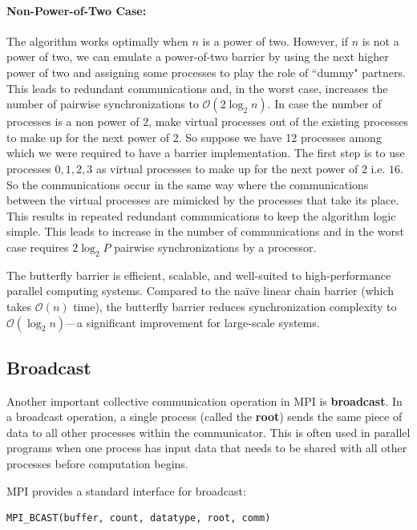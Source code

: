 \documentclass[12pt]{book}
\begin{document}
\paragraph{Non-Power-of-Two Case:}  
The algorithm works optimally when $n$ is a power of two. However, if $n$ is not a power of two, we can emulate a power-of-two barrier by using the next higher power of two and assigning some processes to play the role of ``dummy" partners. This leads to redundant communications and, in the worst case, increases the number of pairwise synchronizations to $\mathcal{O}(2\log_2 n)$. In case the number of processes is a non power of $2$, make virtual processes out of the existing processes to make up for the next power of $2$. So suppose we have 12 processes among which we were required to have a barrier implementation. The first step is to use processes $0,1,2,3$ as virtual processes to make up for the next power of $2$ i.e. $16$. So the communications occur in the same way where the communications between the virtual processes are mimicked by the processes that take its place. This results in repeated redundant communications to keep the algorithm logic simple. This leads to increase in the number of communications and in the worst case requires $2\log_2 P$ pairwise synchronizations by a processor.

The butterfly barrier is efficient, scalable, and well-suited to high-performance parallel computing systems. Compared to the naïve linear chain barrier (which takes $\mathcal{O}(n)$ time), the butterfly barrier reduces synchronization complexity to $\mathcal{O}(\log_2 n)$—a significant improvement for large-scale systems. 





\subsection{Broadcast}

Another important collective communication operation in MPI is \textbf{broadcast}. In a broadcast operation, a single process (called the \textbf{root}) sends the same piece of data to all other processes within the communicator. This is often used in parallel programs when one process has input data that needs to be shared with all other processes before computation begins.

MPI provides a standard interface for broadcast:

\begin{lstlisting}
MPI_BCAST(buffer, count, datatype, root, comm)    
\end{lstlisting}
\end{document}
